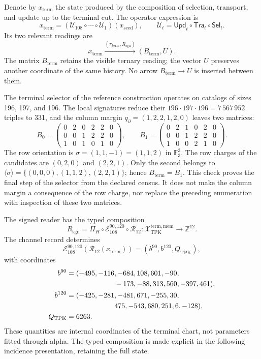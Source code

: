 Denote by \(x_{\mathrm{term}}\) the state produced by the composition
of selection, transport, and update up to the terminal cut. The
operator expression is
\[
 x_{\mathrm{term}}=
 (\mathcal U_{108}\circ\cdots\circ\mathcal U_1)(x_{\mathrm{seed}}),
 \qquad \mathcal U_t=\mathsf{Upd}_t\circ\mathsf{Tra}_t\circ\mathsf{Sel}_t.
\]
Its two relevant readings are
\[
 x_{\mathrm{term}}
 \xrightarrow{(\pi_{\mathrm{term}},R_{\mathrm{sgn}})}
 (B_{\mathrm{term}},U).
\]
The matrix \(B_{\mathrm{term}}\) retains the visible ternary reading; the
vector \(U\) preserves another coordinate of the same history. No arrow
\(B_{\mathrm{term}}\to U\) is inserted between them.

The terminal selector of the reference construction operates on catalogs
of sizes 196, 197, and 196. The local signatures reduce their
\(196\cdot197\cdot196=7\,567\,952\) triples to 331, and the column
margin \(q_{\partial}=(1,2,2,1,2,0)\) leaves two matrices:
\[
 B_0=\begin{pmatrix}0&2&0&2&2&0\\0&0&1&2&2&0\\1&0&1&0&1&0\end{pmatrix},
 \qquad
 B_1=\begin{pmatrix}0&2&1&0&2&0\\0&0&1&2&2&0\\1&0&0&2&1&0\end{pmatrix}.
\]
The row orientation is \(\sigma=(1,1,-1)=(1,1,2)\) in
\(\mathbb F_3^3\). The row charges of the candidates are
\((0,2,0)\) and \((2,2,1)\). Only the second belongs to
\(\langle\sigma\rangle=\{(0,0,0),(1,1,2),(2,2,1)\}\); hence
\(B_{\mathrm{term}}=B_1\). This check proves the final step of the
selector from the declared census. It does not make the column margin
a consequence of the row charge, nor replace the preceding enumeration
with inspection of these two matrices.

The signed reader has the typed composition
\begin{equation}
 R_{\mathrm{sgn}}
 =\Pi_H\circ\mathcal E_{108}^{90,120}\circ\mathcal R_{12}:
 \mathcal X_{\mathrm{TPK}}^{\mathrm{term,mem}}
 \longrightarrow\mathbb Z^{12}.
 \label{eq:k-lector-firmado}
\end{equation}
The channel record determines
\[
 \mathcal E_{108}^{90,120}(\mathcal R_{12}(x_{\mathrm{term}}))
 =(b^{90},b^{120},Q_{\mathrm{TPK}}),
\]
with coordinates
\begin{align*}
 b^{90}={}&(-495,-116,-684,108,601,-90,\\
            &\hspace{19mm}-173,-88,313,560,-397,461),\\
 b^{120}={}&(-425,-281,-481,671,-255,30,\\
             &\hspace{19mm}475,-543,680,251,6,-128),\\
 Q_{\mathrm{TPK}}={}&6263.
\end{align*}
These quantities are internal coordinates of the terminal chart, not
parameters fitted through alpha. The typed composition is made explicit
in the following incidence presentation, retaining the full state.



